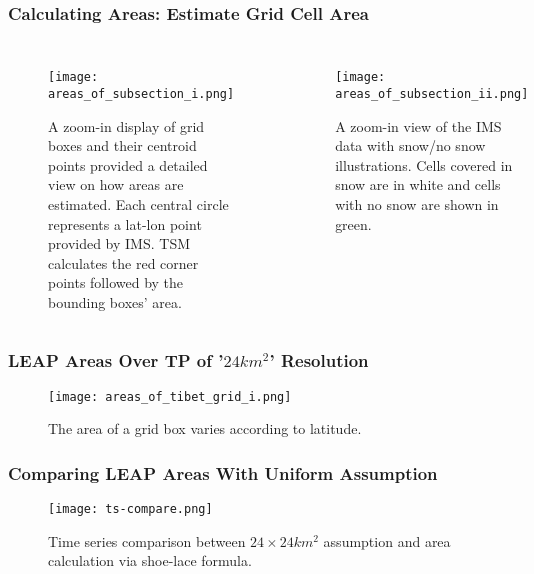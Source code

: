 \begin{frame}
\frametitle{Calculating Areas: Estimate Grid Cell Area}
\begin{columns}
\begin{figure}
\centering
\begin{minipage}{1\columnwidth}
\texttt{[image: areas\_of\_subsection\_i.png]}
\caption{A zoom-in display of grid boxes and their centroid points provided a detailed view on how areas are estimated. Each central circle represents a lat-lon point provided by IMS. TSM calculates the red corner points followed by the bounding boxes' area.}
\end{minipage}
\end{figure}
\begin{figure}
\centering
\begin{minipage}{1\columnwidth}
\texttt{[image: areas\_of\_subsection\_ii.png]}
\caption{A zoom-in view of the IMS data with snow/no snow illustrations. Cells covered in snow are in white and cells with no snow are shown in green.}
\end{minipage}
\end{figure}
\end{columns}
\end{frame}

\begin{frame}
\frametitle{LEAP Areas Over TP of '$24km^{2}$' Resolution}
\begin{figure}
\vspace*{-.5cm}
\centering
\begin{minipage}{.5\columnwidth}
\texttt{[image: areas\_of\_tibet\_grid\_i.png]}
\caption{\tiny{The area of a grid box varies according to latitude.}}
\end{minipage}
\end{figure}
\end{frame}

\begin{frame}
\frametitle{Comparing LEAP Areas With Uniform Assumption}
\begin{figure}
\vspace*{-.5cm}
\centering
\begin{minipage}{.7\columnwidth}
\texttt{[image: ts-compare.png]}
\caption{Time series comparison between $24\times 24 km^{2}$ assumption and area calculation via shoe-lace formula.}
\end{minipage}
\end{figure}
\end{frame}

